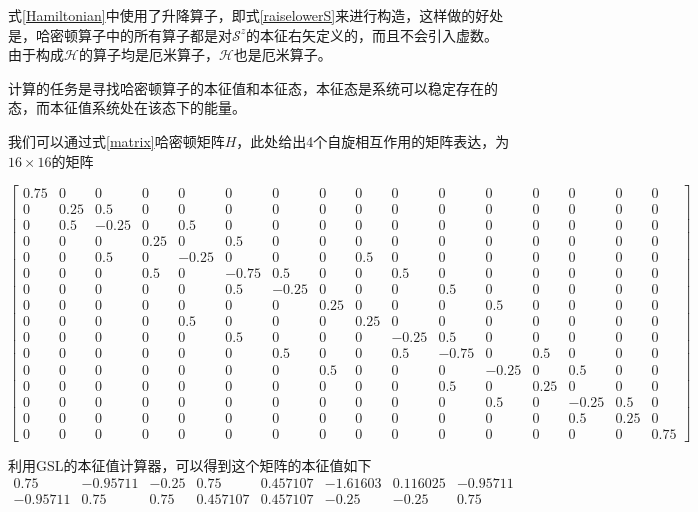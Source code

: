 \documentclass[UTF8,12pt]{article}
\numberwithin{equation}{subsection}
\begin{document}
	式\ref{Hamiltonian}中使用了升降算子，即式\ref{raiselowerS}来进行构造，这样做的好处是，哈密顿算子中的所有算子都是对$\mathcal S^z$的本征右矢定义的，而且不会引入虚数。由于构成$\mathcal H$的算子均是厄米算子，$\mathcal H$也是厄米算子。
	
	计算的任务是寻找哈密顿算子的本征值和本征态，本征态是系统可以稳定存在的态，而本征值系统处在该态下的能量。
	
	我们可以通过式\ref{matrix}哈密顿矩阵$H$，此处给出4个自旋相互作用的矩阵表达，为$16\times16$的矩阵
	
	\begin{tiny}
		\begin{equation}
			\left[\begin{array}{rrrrrrrrrrrrrrrr}
				0.75&0&0&0&0&0&0&0&0&0&0&0&0&0&0&0\\
				0&0.25&0.5&0&0&0&0&0&0&0&0&0&0&0&0&0\\
				0&0.5&-0.25&0&0.5&0&0&0&0&0&0&0&0&0&0&0\\
				0&0&0&0.25&0&0.5&0&0&0&0&0&0&0&0&0&0\\
				0&0&0.5&0&-0.25&0&0&0&0.5&0&0&0&0&0&0&0\\
				0&0&0&0.5&0&-0.75&0.5&0&0&0.5&0&0&0&0&0&0\\
				0&0&0&0&0&0.5&-0.25&0&0&0&0.5&0&0&0&0&0\\
				0&0&0&0&0&0&0&0.25&0&0&0&0.5&0&0&0&0\\
				0&0&0&0&0.5&0&0&0&0.25&0&0&0&0&0&0&0\\
				0&0&0&0&0&0.5&0&0&0&-0.25&0.5&0&0&0&0&0\\
				0&0&0&0&0&0&0.5&0&0&0.5&-0.75&0&0.5&0&0&0\\
				0&0&0&0&0&0&0&0.5&0&0&0&-0.25&0&0.5&0&0\\
				0&0&0&0&0&0&0&0&0&0&0.5&0&0.25&0&0&0\\
				0&0&0&0&0&0&0&0&0&0&0&0.5&0&-0.25&0.5&0\\
				0&0&0&0&0&0&0&0&0&0&0&0&0&0.5&0.25&0\\
				0&0&0&0&0&0&0&0&0&0&0&0&0&0&0&0.75
			\end{array}\right]
		\label{example}
		\end{equation}
	\end{tiny}
	
	利用GSL的本征值计算器，可以得到这个矩阵的本征值如下
	\begin{equation}
		\nonumber
		\begin{array}{rrrrrrrr}
				0.75  & -0.95711 & -0.25 & 0.75  & 0.457107 & -1.61603 & 0.116025 & -0.95711 \\
				-0.95711 & 0.75  & 0.75  & 0.457107 & 0.457107 & -0.25 & -0.25 & 0.75 \\			
		\end{array}
	\end{equation}
	
\end{document}
